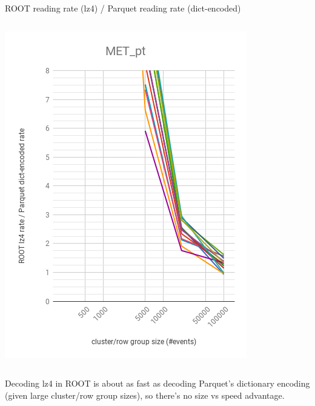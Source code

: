 \documentclass[aspectratio=169]{beamer}
\begin{document}
\begin{frame}{ROOT reading rate (lz4) / Parquet reading rate (dict-encoded)}
\begin{columns}
\begin{center}
\includegraphics[width=\linewidth]{root-lz4-parquet-dict-MET_pt.png}
\end{center}
\end{columns}

\vspace{0.25 cm}
Decoding lz4 in ROOT is about as fast as decoding Parquet's dictionary encoding (given large cluster/row group sizes), so there's no size vs speed advantage.
\end{frame}
\end{document}
